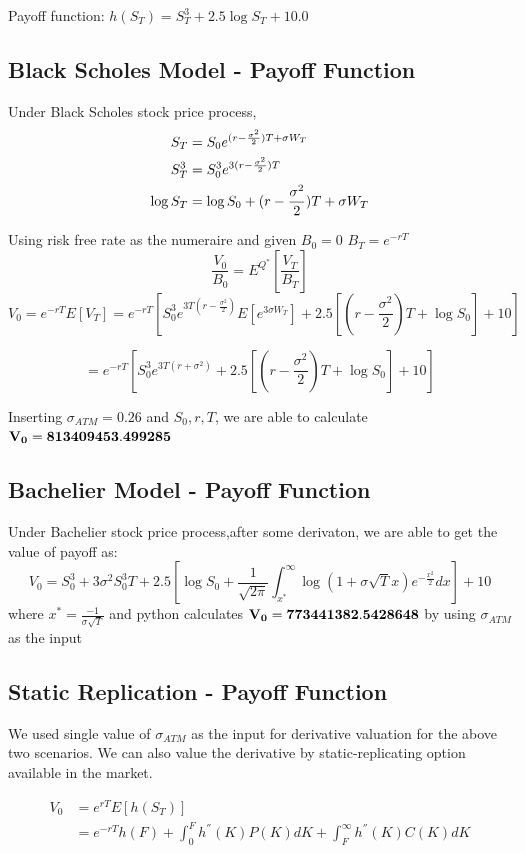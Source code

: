 \documentclass[fleqn,12pt]{SelfArx}
\begin{document}
\noindent Payoff function: $h(S_T)=S_T^3+2.5\log{S_T}+10.0$

\subsection{Black Scholes Model - Payoff Function}
\noindent Under Black Scholes stock price process,
$$
\begin{align} \notag
S_T &= S_0 e^{(r-\frac{\sigma^2}{2})T+\sigma W_T} \\
\notag
S_T^3 &=S_0^3 e^{3(r-\frac{\sigma^2}{2})T} \\
\notag
\log{S_T} &=\log{S_0}+(r-\frac{\sigma^2}{2}) T+\sigma W_T\end{align}$$

\noindent Using risk free rate as the numeraire and given $B_0=0$ $B_T=e^{-rT}$
$$\frac{V_0}{B_0}=E^{Q^*}\left[\frac{V_T}{B_T}\right]$$
$$V_0=e^{-rT}E\left[V_T\right]=e^{-rT}\left[S_0^3 e^{3T(r-\frac{\sigma^2}{2})
}E\left[e^{3\sigma W_T}\right]+2.5\left[(r-\frac{\sigma^2}{2})T+\log{S_0}\right]+10\right]$$

$$=e^{-rT}\left[S_0^3 e^{3T(r+\sigma^2)}+2.5\left[(r-\frac{\sigma^2}{2})T+\log{S_0}\right]+10\right]$$

\noindent Inserting $\sigma_{ATM}=0.26$ and $S_0,r,T$, we are able to calculate $\bf{V_0=813409453.499285}$

\subsection{Bachelier Model - Payoff Function}
\noindent Under Bachelier stock price process,after some derivaton, we are able to get the value of payoff as:
$$V_0=S_0^3+3\sigma^2 S_0^3T+2.5\left[
\log{S_0}+\frac{1}{\sqrt{2\pi}}\int_{x^*}^{\infty}\log(1+\sigma \sqrt{T}x)e^{-\frac{x^2}{2}}dx\right]+10$$
\noindent where $x^*=\frac{-1}{\sigma \sqrt{T}}$ and python calculates $\bf{V_0=773441382.5428648}$ by using $\sigma_{ATM}$ as the input\\

\subsection{Static Replication - Payoff Function}
\noindent We used single value of $\sigma_{ATM}$ as the input for derivative valuation for the above two scenarios. We can also value the derivative by static-replicating option available in the market.


$$ \begin{align}
V_0&=e^{rT}E\left[h(S_T)\right] \\
&=e^{-rT}h(F)+\int_{0}^{F}h^{''}(K)P(K)dK+\int_{F}^{\infty}h^{''}(K)C(K)dK
\end{align} $$
\end{document}
